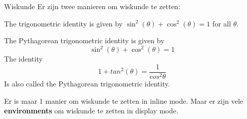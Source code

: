 \copyrightTim

\begin{frame}[fragile]{Wiskunde}
Er zijn twee manieren om wiskunde te zetten:

\begin{tcolorbox}[width=13cm, title={inline mode}, size=small]
    The trigonometric identity is given by \( \sin^2(\theta) + \cos^2(\theta) = 1 \) for all \( \theta \).
\end{tcolorbox}

 \begin{tcolorbox}[width=13cm, title={display mode}, size=small]
    The Pythagorean trigonometric identity is given by
    \begin{equation} \sin^2(\theta) + \cos^2(\theta) = 1 \end{equation}
    The identity
    \begin{equation} 1 + tan^2(\theta) = \frac{1}{cos^2\theta}\end{equation}
    Is also called the Pythagorean trigonometric identity.

\end{tcolorbox}

{\small Er is maar 1 manier om wiskunde te zetten in inline mode.
Maar er zijn vele \textbf{environments} om wiskunde te zetten in display mode.}
\end{frame}